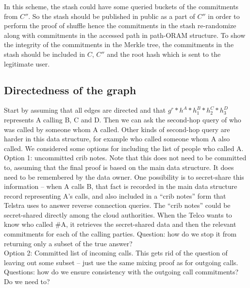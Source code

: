 \documentclass[12pt]{article}
\begin{document}
 In this scheme, the stash could have some queried buckets of the commitments from $C''$. So the stash should be published in public as a part of $C''$ in order to perform the proof of shuffle hence the commitments in the stash re-randomize along with commitments in the accessed path in path-ORAM structure.  To show the integrity of the commitments in the Merkle tree, the commitments in the stash should be included in $C$, $C''$ and the root hash which is sent to the legitimate user.  

	\subsection{Directedness of the graph}
	Start by assuming that all edges are directed and that $g^r* h^A*h_1^B*h_2^C*h_3^D$ represents A calling B, C and D.  Then we can ask the second-hop query of who was called by someone whom A called.
	Other kinds of second-hop query are harder in this data structure, for example who called someone whom A also called.  We considered some options for including the list of people who called A.\\
	Option 1: uncommitted crib notes.  Note that this does not need to be committed to, assuming that the final proof is based on the main data structure.  It does need to be remembered by the data owner.  One possibility is to secret-share this information – when A calls B, that fact is recorded in the main data structure record representing A’s calls, and also included in a “crib notes” form that Telstra uses to answer reverse connection queries.  The “crib notes” could be secret-shared directly among the cloud authorities.  When the Telco wants to know who called #A, it retrieves the secret-shared data and then the relevant commitments for each of the calling parties.
	Question: how do we stop it from returning only a subset of the true answer?\\
	Option 2: Committed list of incoming calls.  This gets rid of the question of leaving out some subset – just use the same mixing proof as for outgoing calls.  
	Questions: how do we ensure consistency with the outgoing call commitments?  Do we need to?
	
	
	   
	
\end{document}
